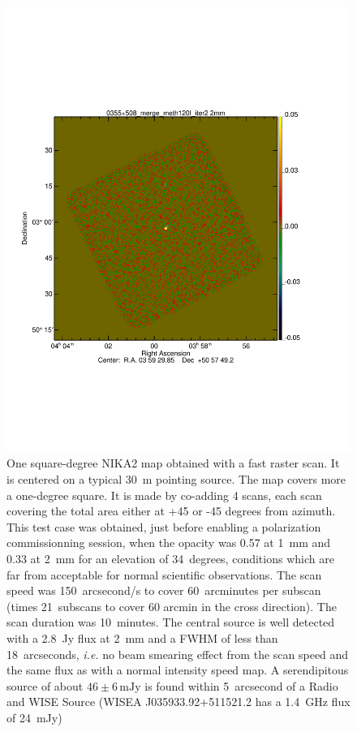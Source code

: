 \documentclass[11pt,a4paper,twoside,graphicx,color]{article}
\begin{document}
\begin{figure}
  \begin{center}
   \includegraphics[width=0.4\columnwidth]{./Figures/0355+508_merge_meth120I_iter2_source_detect2mm.pdf}
  \end{center}
\caption{One square-degree NIKA2 map obtained with a fast raster
scan. It is centered on a typical 30~m pointing source.  The map covers more a one-degree square. It is made by
co-adding 4 scans, each scan covering the total area either at +45 or -45 degrees from azimuth. This test case was obtained, just before enabling a polarization commissionning session, when the opacity was 0.57 at 1~mm and 0.33 at 2~mm for an elevation of 34~degrees, conditions which are far from acceptable for normal scientific observations. The scan speed was 150~arcsecond/s to cover 60~arcminutes per subscan (times 21~subscans to cover 60 arcmin in the cross direction). The scan duration was 10~minutes. The central source is well detected with a 2.8~Jy flux at 2~mm and a FWHM of less than 18~arcseconds, {\sl i.e.} no beam smearing effect from the scan speed and the same flux as with a normal intensity speed map. A serendipitous source of about $46\pm6\,\mathrm{mJy}$ is found within 5~arcsecond of a Radio and WISE Source (WISEA J035933.92+511521.2 has a 1.4~GHz flux of 24~mJy)}
\label{Fig:1sqdegMap}

\end{figure}
\end{document}
